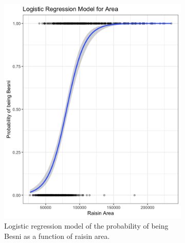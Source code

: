 \documentclass{article}
\begin{document}
\begin{figure}[ht]
	\centering
	\begin{subfigure}{0.4\textwidth}
		\includegraphics[width=\textwidth]{area_plot}
		\caption{Logistic regression model of the probability of being Besni as a function of raisin area.}
		\label{fig:area}
	\end{subfigure}
	\hfill
	\begin{subfigure}{0.4\textwidth}

\end{subfigure}
\end{figure}
\end{document}
